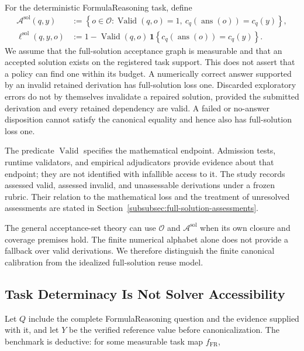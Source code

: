 \documentclass[10pt]{article} %
\providecommand{\1}{\mathbf{1}}  %
\theoremstyle{remark}
\theoremstyle{definition}
\begin{document}
For the deterministic FormulaReasoning task, define
\begin{align}
\mathcal A^{\mathrm{sol}}(q,y)
&:=
\left\{o\in\mathcal O:
\operatorname{Valid}(q,o)=1,\ 
c_q(\operatorname{ans}(o))=c_q(y)\right\},
\label{eq:theory-full-solution-acceptance}\\
\ell^{\mathrm{sol}}(q,y,o)
&:=
1-\operatorname{Valid}(q,o)\,
\mathbf 1\!\left\{c_q(\operatorname{ans}(o))=c_q(y)\right\}.
\label{eq:theory-full-solution-loss}
\end{align}
We assume that the full-solution acceptance graph is measurable and
that an accepted solution exists on the registered task support. This
does not assert that a policy can find one within its budget. A
numerically correct answer supported by an invalid retained derivation
has full-solution loss one. Discarded exploratory errors do not by
themselves invalidate a repaired solution, provided the submitted
derivation and every retained dependency are valid. A failed or
no-answer disposition cannot satisfy the canonical equality and hence
also has full-solution loss one.

The predicate $\operatorname{Valid}$ specifies the mathematical
endpoint. Admission tests, runtime validators, and empirical
adjudicators provide evidence about that endpoint; they are not
identified with infallible access to it. The study records assessed
valid, assessed invalid, and unassessable derivations under a frozen
rubric. Their relation to the mathematical loss and the treatment of
unresolved assessments are stated in
Section~\ref{subsubsec:full-solution-assessments}.

The general acceptance-set theory can use $\mathcal O$ and
$\mathcal A^{\mathrm{sol}}$ when its own closure and coverage premises
hold. The finite numerical alphabet alone does not provide a fallback
over valid derivations. We therefore distinguish the finite canonical
calibration from the idealized full-solution reuse model.

\subsection{Task Determinacy Is Not Solver Accessibility}
\label{subsec:task-determinacy}

Let $Q$ include the complete FormulaReasoning question and the evidence supplied with it, and let $Y$ be the verified reference value before canonicalization. The benchmark is deductive: for some measurable task map $f_{\mathrm{FR}}$,
\end{document}

